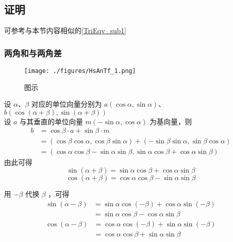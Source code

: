 \subsection{证明}

可参考与本节内容相似的\autoref{TriEqv_sub1}~

\subsubsection{两角和与两角差}
\begin{figure}[ht]
\centering
\texttt{[image: ./figures/HsAnTf\_1.png]}
\caption{图示} \label{HsAnTf_fig1}
\end{figure}
设 $\alpha$、$\beta$ 对应的单位向量分别为 $a(\cos\alpha,\sin\alpha)$、$b(\cos(\alpha+\beta),\sin(\alpha+\beta))$\\
设 $a$ 与其垂直的单位向量 $m(-\sin\alpha,\cos\alpha)$ 为基向量，则
\begin{equation}
\begin{aligned}
b &= \cos\beta \cdot a + \sin\beta \cdot m \\
&= (\cos\beta \cos\alpha,\cos\beta \sin\alpha) + (-\sin\beta \sin\alpha,\sin\beta \cos\alpha) \\
&= (\cos\alpha \cos\beta-\sin\alpha \sin\beta,\sin\alpha \cos\beta + \cos\alpha \sin\beta)
\end{aligned}
\end{equation}
由此可得
\begin{equation}
\sin(\alpha+\beta) = \sin\alpha \cos\beta + \cos\alpha \sin\beta
\end{equation}
\begin{equation}
\cos(\alpha+\beta) = \cos\alpha \cos\beta - \sin\alpha \sin\beta
\end{equation}

用 $-\beta$ 代换 $\beta$ ，可得
\begin{equation}
\begin{aligned}
\sin(\alpha-\beta) &= \sin\alpha \cos(-\beta) + \cos\alpha \sin(-\beta)\\
&=\sin\alpha \cos\beta - \cos\alpha \sin\beta
\end{aligned}
\end{equation}
\begin{equation}
\begin{aligned}
\cos(\alpha-\beta) &= \cos\alpha \cos(-\beta) + \sin\alpha \sin(-\beta)\\
&=\cos\alpha \cos\beta + \sin\alpha \sin\beta
\end{aligned}
\end{equation}

